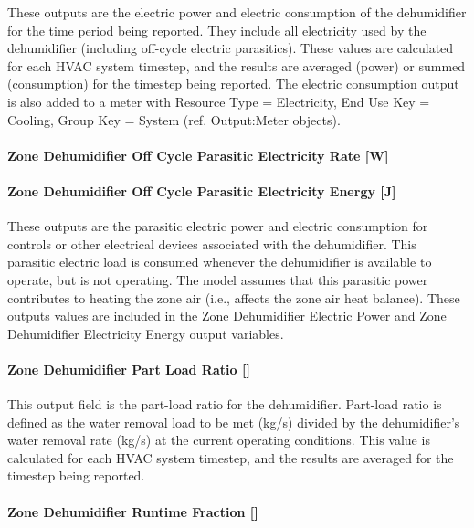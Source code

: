These outputs are the electric power and electric consumption of the dehumidifier for the time period being reported. They include all electricity used by the dehumidifier (including off-cycle electric parasitics). These values are calculated for each HVAC system timestep, and the results are averaged (power) or summed (consumption) for the timestep being reported. The electric consumption output is also added to a meter with Resource Type = Electricity, End Use Key = Cooling, Group Key = System (ref. Output:Meter objects).

\paragraph{Zone Dehumidifier Off Cycle Parasitic Electricity Rate {[}W{]}}\label{zone-dehumidifier-off-cycle-parasitic-electric-power-w}

\paragraph{Zone Dehumidifier Off Cycle Parasitic Electricity Energy {[}J{]}}\label{zone-dehumidifier-off-cycle-parasitic-electric-energy-j}

These outputs are the parasitic electric power and electric consumption for controls or other electrical devices associated with the dehumidifier. This parasitic electric load is consumed whenever the dehumidifier is available to operate, but is not operating. The model assumes that this parasitic power contributes to heating the zone air (i.e., affects the zone air heat balance). These outputs values are included in the Zone Dehumidifier Electric Power and Zone Dehumidifier Electricity Energy output variables.

\paragraph{Zone Dehumidifier Part Load Ratio {[]}}\label{zone-dehumidifier-part-load-ratio}

This output field is the part-load ratio for the dehumidifier. Part-load ratio is defined as the water removal load to be met (kg/s) divided by the dehumidifier's water removal rate (kg/s) at the current operating conditions. This value is calculated for each HVAC system timestep, and the results are averaged for the timestep being reported.

\paragraph{Zone Dehumidifier Runtime Fraction {[]}}\label{zone-dehumidifier-runtime-fraction}


